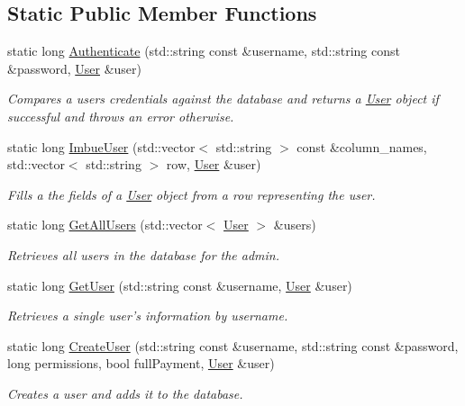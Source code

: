 \subsection*{Static Public Member Functions}
\begin{DoxyCompactItemize}
\item 
static long \hyperlink{classUser_1_1UserTable_a805655228f47be97023baec681a2847e}{Authenticate} (std\-::string const \&username, std\-::string const \&password, \hyperlink{classUser_1_1User}{User} \&user)
\begin{DoxyCompactList}\small\item\em Compares a users credentials against the database and returns a \hyperlink{classUser_1_1User}{User} object if successful and throws an error otherwise. \end{DoxyCompactList}\item 
static long \hyperlink{classUser_1_1UserTable_a928ca6e6a4d8c2700280b3145e4df955}{Imbue\-User} (std\-::vector$<$ std\-::string $>$ const \&column\-\_\-names, std\-::vector$<$ std\-::string $>$ row, \hyperlink{classUser_1_1User}{User} \&user)
\begin{DoxyCompactList}\small\item\em Fills a the fields of a \hyperlink{classUser_1_1User}{User} object from a row representing the user. \end{DoxyCompactList}\item 
static long \hyperlink{classUser_1_1UserTable_a454047b50c369b81c9206f3d8e507a58}{Get\-All\-Users} (std\-::vector$<$ \hyperlink{classUser_1_1User}{User} $>$ \&users)
\begin{DoxyCompactList}\small\item\em Retrieves all users in the database for the admin. \end{DoxyCompactList}\item 
static long \hyperlink{classUser_1_1UserTable_ae258255d5d47944fbdaf87069dcbaace}{Get\-User} (std\-::string const \&username, \hyperlink{classUser_1_1User}{User} \&user)
\begin{DoxyCompactList}\small\item\em Retrieves a single user's information by username. \end{DoxyCompactList}\item 
static long \hyperlink{classUser_1_1UserTable_a5fd5bd887205ab0e59c366f20970891b}{Create\-User} (std\-::string const \&username, std\-::string const \&password, long permissions, bool full\-Payment, \hyperlink{classUser_1_1User}{User} \&user)
\begin{DoxyCompactList}\small\item\em Creates a user and adds it to the database. \end{DoxyCompactList}\item 

\end{DoxyCompactItemize}
